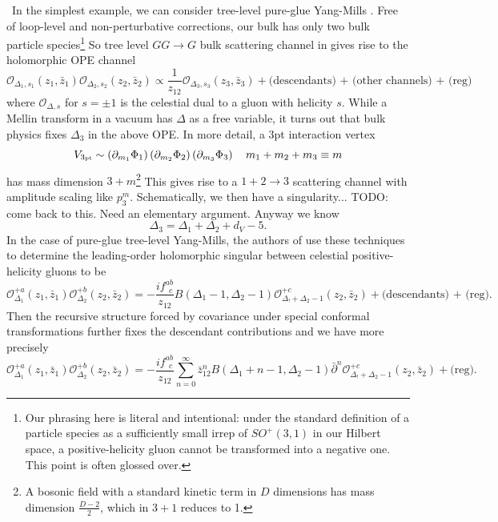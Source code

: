 \documentclass[11pt,letterpaper]{article}
\newcommand{\LP}{\left(}
\newcommand{\RP}{\right)}
\newcommand{\mc}[1]{\mathcal{#1}}
\newcommand{\D}{\partial}
\begin{document}
\
In the simplest example, we can consider tree-level pure-glue Yang-Mills \cite{Pate:2019lpp}. Free of loop-level and non-perturbative corrections, our bulk has only two bulk particle species\footnote{Our phrasing here is literal and intentional: under the standard definition of a particle species as a sufficiently small irrep of $SO^+(3,1)$ in our Hilbert space, a positive-helicity gluon cannot be transformed into a negative one. This point is often glossed over.} So tree level $GG \to G$ bulk scattering channel in gives rise to the holomorphic OPE channel \begin{equation}
\mc{O}_{\Delta_1, s_1} (z_1, \bar{z}_1) \mc{O}_{\Delta_2, s_2} (z_2, \bar{z}_2) \propto \frac{1}{z_{12}} \mc{O}_{\Delta_3, s_3} (z_3, \bar{z}_3) + \mbox{(descendants) + (other channels) + (reg)}
\end{equation}
where $\mc{O}_{\Delta, s}$ for $s = \pm 1$ is the celestial dual to a gluon with helicity $s$. While a Mellin transform in a vacuum has $\Delta$ as a free variable, it turns out that bulk physics fixes $\Delta_3$ in the above OPE. In more detail, a 3pt interaction vertex \begin{equation}
V_{3 \mbox{\tiny{pt}}} \sim \LP \D_{m_1} \Phi_1 \RP \LP \D_{m_2} \Phi_2 \RP \LP \D_{m_3} \Phi_3 \RP \quad m_1 + m_2 + m_3 \equiv m
\end{equation} 
has mass dimension $3 + m$\footnote{A bosonic field with a standard kinetic term in $D$ dimensions has mass dimension $\frac{D-2}{2}$, which in $3+1$ reduces to 1.} This gives rise to a $1 + 2 \to 3$ scattering channel with amplitude scaling like $p_3^m$. Schematically, we then have a singularity... TODO: come back to this. Need an elementary argument. Anyway we know \begin{equation}
\Delta_3 = \Delta_1 + \Delta_2 + d_V - 5.
\end{equation}
In the case of pure-glue tree-level Yang-Mills, the authors of \cite{Pate:2019lpp} use these techniques to determine the leading-order holomorphic singular between celestial positive-helicity gluons to be \begin{equation}
\mc{O}^{+a}_{\Delta_1} (z_1, \bar{z}_1)
\mc{O}^{+b}_{\Delta_2} (z_2, \bar{z}_2) = - \frac{if^{ab}_{ \ \ c}}{z_{12}} B(\Delta_1 - 1, \Delta_2 - 1) \mc{O}^{+c}_{\Delta_! + \Delta_2 - 1}(z_2, \bar{z}_2) + \mbox{(descendants) + (reg)}.
\end{equation}
Then the recursive structure forced by covariance under special conformal transformations further fixes the descendant contributions and we have more precisely \begin{equation}
\mc{O}^{+a}_{\Delta_1} (z_1, \bar{z}_1)
\mc{O}^{+b}_{\Delta_2} (z_2, \bar{z}_2) = - \frac{if^{ab}_{ \ \ c}}{z_{12}} \sum_{n = 0}^\infty \bar{z}_{12}^n B(\Delta_1 + n - 1, \Delta_2 - 1) \bar{\D}^n \mc{O}^{+c}_{\Delta_! + \Delta_2 - 1}(z_2, \bar{z}_2) + \mbox{(reg)}.
\end{equation}
\end{document}
